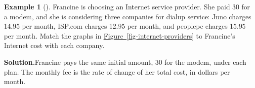 \documentclass[10pt,]{book}
\theoremstyle{plain}
\theoremstyle{definition}
\theoremstyle{definition}
\newtheorem{example}[theorem]{Example}
\theoremstyle{definition}
\theoremstyle{definition}
\numberwithin{equation}{part}
\newlength{\panelmax}
\begin{document}
\begin{example}[]\label{example-internet-providers}
Francine is choosing an Internet service provider. She paid \textdollar{}30 for a modem, and she is considering three companies for dialup service: Juno charges \textdollar{}14.95 per month, ISP.com charges \textdollar{}12.95 per month, and peoplepc charges \textdollar{}15.95 per month. Match the graphs in \hyperref[fig-internet-providers]{Figure~\ref{fig-internet-providers}} to Francine’s Internet cost with each company.%
\par\medskip\noindent%
\textbf{Solution.}\quad Francine pays the same initial amount, \textdollar{}30 for the modem, under each plan. The monthly fee is the rate of change of her total cost, in dollars per month.%
{%
\setlength{\panelmax}{0pt}
\newsavebox{\panelboxBNIp}
\newlength{\phBNIp}\setlength{\phBNIp}{\ht\panelboxBNIp+\dp\panelboxBNIp}
\settototalheight{\phBNIp}{\usebox{\panelboxBNIp}}
\setlength{\panelmax}{\maxof{\panelmax}{\phBNIp}}
\newsavebox{\panelboxGDimage}
}
\end{example}
\end{document}
